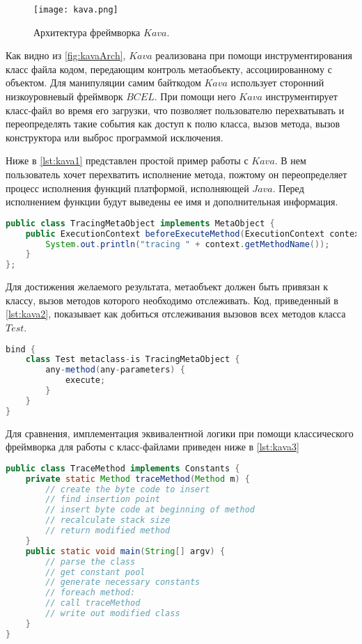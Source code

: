\begin{figure}[h]
\centering
\texttt{[image: kava.png]}
\caption{Архитектура фреймворка $Kava$.}
\label{fig:kavaArch}
\end{figure}

Как видно из \autoref{fig:kavaArch}, $Kava$ реализована при помощи инструментирования класс файла кодом, передающим контроль метаобъекту, ассоциированному с объектом. Для манипуляции самим байткодом $Kava$ использует сторонний низкоуровневый фреймворк $BCEL$. При помощи него $Kava$ инструментирует класс-файл во время его загрузки, что позволяет пользователю перехватывать и переопределять такие события как доступ к полю класса, вызов метода, вызов конструктора или выброс программой исключения.

Ниже в \autoref{lst:kava1} представлен простой пример работы с $Kava$. В нем пользователь хочет перехватить исполнение метода, пожтому он переопределяет процесс исполнения функций платформой, исполняющей $Java$. Перед исполнением функции будут выведены ее имя и дополнительная информация.

\begin{lstlisting}[language=Java, caption=Объявление метаобъекта в $Kava$, label=lst:kava1]
public class TracingMetaObject implements MetaObject {
    public ExecutionContext beforeExecuteMethod(ExecutionContext context) {
        System.out.println("tracing " + context.getMethodName());
    }
};
\end{lstlisting}

Для достижения желаемого результата, метаобъект должен быть привязан к классу, вызов методов которого необходимо отслеживать. Код, приведенный в \autoref{lst:kava2}, показывает как добиться отслеживания вызовов всех методов класса $Test$.

\begin{lstlisting}[language=Java, caption=Привязка класса к метаобъекту в $Kava$, label=lst:kava2]
bind {
    class Test metaclass-is TracingMetaObject {
        any-method(any-parameters) {
            execute;
        }
    }
}
\end{lstlisting}

Для сравнения, имплементация эквивалентной логики при помощи классического фреймворка для работы с класс-файлами приведен ниже в \autoref{lst:kava3}

\begin{lstlisting}[language=Java, caption=Реализация аналогичной функциональности при помощи классического фреймворка для работы с класс-файлом, label=lst:kava3]
public class TraceMethod implements Constants {
    private static Method traceMethod(Method m) {
        // create the byte code to insert
        // find insertion point
        // insert byte code at beginning of method
        // recalculate stack size
        // return modified method
    }
    public static void main(String[] argv) {
        // parse the class
        // get constant pool
        // generate necessary constants
        // foreach method:
        // call traceMethod
        // write out modified class
    }
}
\end{lstlisting}

